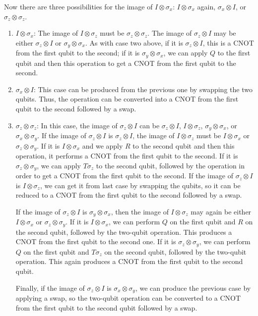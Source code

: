 \documentclass{report}
\newcommand{\X}{\sigma_x}
\newcommand{\Z}{\sigma_z}
\newcommand{\Y}{\sigma_y}
\begin{document}
\begin{itemize}
Now there are three possibilities for the image of $I \otimes \X$: $I 
\otimes \X$ again, $\X \otimes I$, or $\Z \otimes \Z$.

\begin{enumerate}
\item $I \otimes \X$: The image of $I \otimes \Z$ must be $\Z \otimes \Z$.  
The image of $\Z \otimes I$ may be either $\Z \otimes I$ or $\Y \otimes 
\X$.  As with case two above, if it is $\Z \otimes I$, this is a CNOT from the 
first qubit to the second; if it is $\Y \otimes \X$, we can apply $Q$ to the 
first qubit and then this operation to get a CNOT from the first qubit to the 
second.

\item $\X \otimes I$: This case can be produced from the previous one by 
swapping the two qubits.  Thus, the operation can be converted into a 
CNOT from the first qubit to the second followed by a swap.

\item $\Z \otimes \Z$: In this case, the image of $\Z \otimes I$ can be $\Z 
\otimes I$, $I \otimes \Z$, $\Y \otimes \X$, or $\X \otimes \Y$.  If the 
image of $\Z \otimes I$ is $\Z \otimes I$, the image of $I \otimes \Z$ must 
be $I \otimes \X$ or $\Z \otimes \Y$.  If it is $I \otimes \X$ and we apply 
$R$ to the second qubit and then this operation, it performs a CNOT from the 
first qubit to the second.  If it is $\Z \otimes \Y$, we can apply $T \Z$
to the second qubit, followed by the operation in order to get a CNOT
from the first qubit to the second.  If the image of $\Z \otimes I$ is $I 
\otimes \Z$, we can get it from last case by swapping the qubits, so it can be 
reduced to a CNOT from the first qubit to the second followed by a swap.

If the image of $\Z \otimes I$ is $\Y \otimes \X$, then the image of $I 
\otimes \Z$ may again be either $I \otimes \X$ or $\Z \otimes \Y$.  If it is $I 
\otimes \X$, we can perform $Q$ on the first qubit and $R$ on the second 
qubit, followed by the two-qubit operation.  This produces a CNOT from the 
first qubit to the second one.  If it is $\Z \otimes \Y$, we can perform $Q$ 
on the first qubit and $T \Z$ on the second qubit, followed by the 
two-qubit operation.  This again produces a CNOT from the first qubit to 
the second qubit.

Finally, if the image of $\Z \otimes I$ is $\X \otimes \Y$, we can produce 
the previous case by applying a swap, so the two-qubit operation can be 
converted to a CNOT from the first qubit to the second qubit followed by a 
swap.
\end{enumerate}
\end{itemize}
\end{document}
